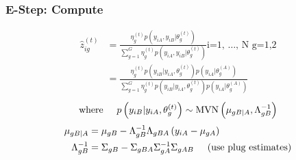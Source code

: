 \documentclass[a4paper,12pt]{article}\usepackage[]{graphicx}\usepackage[]{color}
\begin{document}
\subsubsection*{E-Step: Compute}
\begin{align*}
\hat{z}_{ig}^{\left(t \right)} &= \frac{ \eta_{g}^{\left(t \right)}p \left(y_{iA}, y_{iB}| \theta_{g}^{\left(t \right)} \right)}{\sum_{g=1}^{G} \eta_{g}^{\left(t \right)} p \left(y_{iA},y_{iB} | \theta_{g}^{\left(t \right)} \right)} \text{i=1, $\ldots$, N g=1,2}\\
&=\frac{\eta_{g}^{\left(t \right)} p \left(y_{iB}|y_{iA}, \theta_{g}^{\left(t \right)} \right) p \left( y_{iA}| \theta_{g}^{\left( A \right)} \right)}{\sum_{g=1}^{G}\eta_{g}^{\left(t \right)} p \left(y_{iB}|y_{iA}, \theta_{g}^{\left(t \right)} \right) p \left( y_{iA}| \theta_{g}^{\left( A \right)} \right)}
\end{align*}
\noindent{}
\[
\text{where} \hspace{5mm}
p \left(y_{iB}|y_{iA}, \theta_{g}^{\left(t \right)} \right) \sim \text{MVN} \left(\mu_{gB|A}, \Lambda_{gB}^{-1} \right) 
\]
\noindent{}
\begin{align*}
\mu_{gB|A} &= \mu_{gB} - \Lambda_{gB}^{-1} \Lambda_{gBA} \left(y_{iA} -\mu_{gA} \right)\\
\Lambda_{gB}^{-1} &= \Sigma_{gB} - \Sigma_{gBA} \Sigma_{gA}^{-1}\Sigma_{gAB} \hspace{5mm} \text{(use plug estimates)}
\end{align*}
\noindent{}
\end{document}
